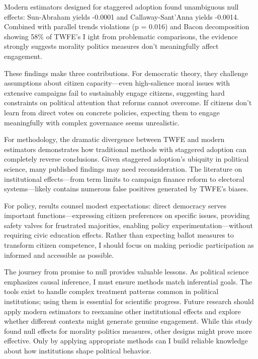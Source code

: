 \documentclass[12pt,letterpaper,oneside]{book}
\begin{document}
Modern estimators designed for staggered adoption found unambiguous null effects: Sun-Abraham yields -0.0001 and Callaway-Sant'Anna yields -0.0014. Combined with parallel trends violations (p = 0.016) and Bacon decomposition showing 58\% of TWFE's I ight from problematic comparisons, the evidence strongly suggests morality politics measures don't meaningfully affect engagement.

These findings make three contributions. For democratic theory, they challenge assumptions about citizen capacity—even high-salience moral issues with extensive campaigns fail to sustainably engage citizens, suggesting hard constraints on political attention that reforms cannot overcome. If citizens don't learn from direct votes on concrete policies, expecting them to engage meaningfully with complex governance seems unrealistic.

For methodology, the dramatic divergence between TWFE and modern estimators demonstrates how traditional methods with staggered adoption can completely reverse conclusions. Given staggered adoption's ubiquity in political science, many published findings may need reconsideration. The literature on institutional effects—from term limits to campaign finance reform to electoral systems—likely contains numerous false positives generated by TWFE's biases.

For policy, results counsel modest expectations: direct democracy serves important functions—expressing citizen preferences on specific issues, providing safety valves for frustrated majorities, enabling policy experimentation—without requiring civic education effects. Rather than expecting ballot measures to transform citizen competence, I should focus on making periodic participation as informed and accessible as possible.

The journey from promise to null provides valuable lessons. As political science emphasizes causal inference, I must ensure methods match inferential goals. The tools exist to handle complex treatment patterns common in political institutions; using them is essential for scientific progress. Future research should apply modern estimators to reexamine other institutional effects and explore whether different contexts might generate genuine engagement. While this study found null effects for morality politics measures, other designs might prove more effective. Only by applying appropriate methods can I build reliable knowledge about how institutions shape political behavior.

\clearpage
\end{document}
